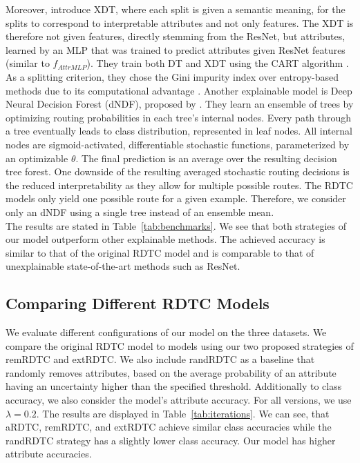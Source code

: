 \documentclass[a4paper,cleardoubleempty,BCOR1cm, 11pt]{report}
\begin{document}
Moreover, \citet{alaniz2019explainable} introduce XDT, where each split is given a semantic meaning, for the splits to correspond to interpretable attributes and not only features. The XDT is therefore not given features, directly stemming from the ResNet, but attributes, learned by an MLP that was trained to predict attributes given ResNet features (similar to $f_{AttrMLP}$). They train both DT and XDT using the CART algorithm \cite{breiman1984classification}. As a splitting criterion, they chose the Gini impurity index over entropy-based methods due to its computational advantage \cite{raileanu2004theoretical}.
Another explainable model is Deep Neural Decision Forest (dNDF), proposed by \citet{kontschieder2015deep}. They learn an ensemble of trees by optimizing routing probabilities in each tree's internal nodes. Every path through a tree eventually leads to class distribution, represented in leaf nodes. All internal nodes are sigmoid-activated, differentiable stochastic functions, parameterized by an optimizable $\theta$. The final prediction is an average over the resulting decision tree forest. One downside of the resulting averaged stochastic routing decisions is the reduced interpretability as they allow for multiple possible routes. The RDTC models only yield one possible route for a given example. Therefore, we consider only an dNDF using a single tree instead of an ensemble mean.\\
The results are stated in Table~\ref{tab:benchmarks}. We see that both strategies of our model outperform other explainable methods. The achieved accuracy is similar to that of the original RDTC model and is comparable to that of unexplainable state-of-the-art methods such as ResNet. 




\subsection{Comparing Different RDTC Models}
We evaluate different configurations of our model on the three datasets. We compare the original RDTC model to models using our two proposed strategies of remRDTC and extRDTC. We also include randRDTC as a baseline that randomly removes attributes, based on the average probability of an attribute having an uncertainty higher than the specified threshold. Additionally to class accuracy, we also consider the model's attribute accuracy. For all versions, we use $\lambda=0.2$. The results are displayed in Table~\ref{tab:iterations}. We can see, that aRDTC, remRDTC, and extRDTC achieve similar class accuracies while the randRDTC strategy has a slightly lower class accuracy. Our model has higher attribute accuracies. %
\end{document}
